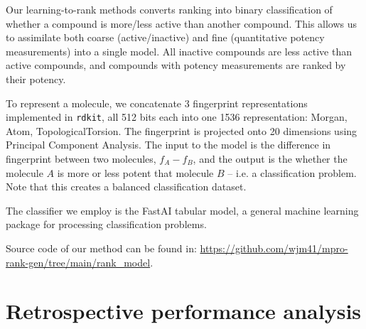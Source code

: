 


Our learning-to-rank methods converts ranking into binary classification of whether a compound is more/less active than another compound. This allows us to assimilate both coarse (active/inactive) and fine (quantitative potency measurements) into a single model. All inactive compounds are less active than active compounds, and compounds with potency measurements are ranked by their potency.  

To represent a molecule, we concatenate 3 fingerprint representations implemented in \texttt{rdkit}, all 512 bits each into one 1536 representation: Morgan, Atom, TopologicalTorsion. The fingerprint is projected onto 20 dimensions using Principal Component Analysis. The input to the model is the difference in fingerprint between two molecules, $f_A - f_B$, and the output is the whether the molecule $A$ is more or less potent that molecule $B$ -- i.e. a classification problem. Note that this creates a balanced classification dataset.  

The classifier we employ is the FastAI tabular model, a general machine learning package for processing classification problems. 

Source code of our method can be found in: \url{https://github.com/wjm41/mpro-rank-gen/tree/main/rank_model}.  

\section{Retrospective performance analysis} 

